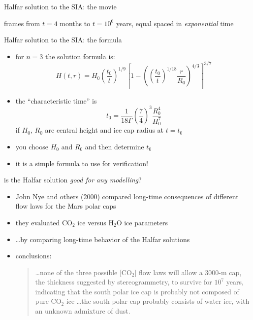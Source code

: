 \begin{frame}{Halfar solution to the SIA: the movie}
\label{slide:plothalfar}


\par
\scriptsize 
frames from $t=4$ months to $t = 10^6$ years, equal spaced in \emph{exponential} time
\end{frame}


\begin{frame}{Halfar solution to the SIA: the formula}

\begin{itemize}
\item for $n=3$ the solution formula is:
  $$H(t,r) = H_0 \left(\frac{t_0}{t}\right)^{1/9} \left[1 - \left(\left(\frac{t_0}{t}\right)^{1/18} \frac{r}{R_0}\right)^{4/3}\right]^{3/7}$$
\item the ``characteristic time'' is
  $$t_0 = \frac{1}{18 \Gamma} \left(\frac{7}{4}\right)^3 \frac{R_0^4}{H_0^{7}}$$
if $H_0$, $R_0$ are central height and ice cap radius at $t=t_0$
\item you choose $H_0$ and $R_0$ and then determine $t_0$
\item it is a simple formula to use for verification!
\end{itemize}
\end{frame}


\begin{frame}{is the Halfar solution \emph{good for any modelling}?}

\begin{itemize}
\item John Nye and others (2000) compared long-time consequences of different flow laws for the Mars polar caps
\item they evaluated $\text{CO}_2$ ice versus $\text{H}_2\text{O}$ ice parameters
\item \dots by comparing long-time behavior of the Halfar solutions
\item conclusions:
  \begin{quote}
  \dots none of the three possible [$\text{CO}_2$] flow laws will allow a 3000-m cap, the thickness suggested by stereogrammetry, to survive for $10^7$ years, indicating that the south polar ice cap is probably not composed of pure $\text{CO}_2$ ice \dots the south polar cap probably consists of water ice, with an unknown admixture of dust.
  \end{quote}
\end{itemize}

\end{frame}


